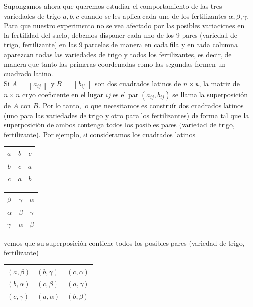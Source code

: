 \documentclass[10pt]{article}
\begin{document}
Supongamos ahora que queremos estudiar el comportamiento de las tres variedades de trigo $a, b, c$ cuando se les aplica cada uno de los fertilizantes $\alpha, \beta, \gamma$. Para que nuestro experimento no se vea afectado por las posibles variaciones en la fertilidad del suelo, debemos disponer cada uno de los 9 pares (variedad de trigo, fertilizante) en las 9 parcelas de manera en cada fila y en cada columna aparezcan todas las variedades de trigo y todos los fertilizantes, es decir, de manera que tanto las primeras coordenadas como las segundas formen un cuadrado latino.\\
Si $A=\left\|a_{i j}\right\|$ y $B=\left\|b_{i j}\right\|$ son dos cuadrados latinos de $n \times n$, la matriz de $n \times n$ cuyo coeficiente en el lugar $i j$ es el par $\left(a_{i j}, b_{i j}\right)$ se llama la superposición de $A$ con $B$. Por lo tanto, lo que necesitamos es construír dos cuadrados latinos (uno para las variedades de trigo y otro para los fertilizantes) de forma tal que la superposición de ambos contenga todos los posibles pares (variedad de trigo, fertilizante). Por ejemplo, si consideramos los cuadrados latinos

\begin{center}
\begin{tabular}{|c|c|c|}
\hline
$a$ & $b$ & $c$ \\
\hline
$b$ & $c$ & $a$ \\
\hline
$c$ & $a$ & $b$ \\
\hline
\end{tabular}
\end{center}

\begin{center}
\begin{tabular}{|l|l|l|}
\hline
$\beta$ & $\gamma$ & $\alpha$ \\
\hline
$\alpha$ & $\beta$ & $\gamma$ \\
\hline
$\gamma$ & $\alpha$ & $\beta$ \\
\hline
\end{tabular}
\end{center}

vemos que su superposición contiene todos los posibles pares (variedad de trigo, fertilizante)

\begin{center}
\begin{tabular}{|l|l|l|}
\hline
$(a, \beta)$ & $(b, \gamma)$ & $(c, \alpha)$ \\
\hline
$(b, \alpha)$ & $(c, \beta)$ & $(a, \gamma)$ \\
\hline
$(c, \gamma)$ & $(a, \alpha)$ & $(b, \beta)$ \\
\hline
\end{tabular}
\end{center}
\end{document}
